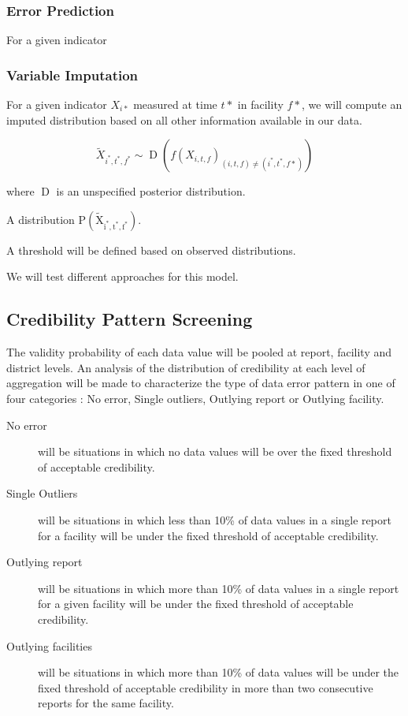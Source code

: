 \subsubsection{Error Prediction}

For a given indicator

\subsubsection{Variable Imputation}

For a given indicator $X_{i*}$ measured at time $t*$ in facility $f*$, we will compute an imputed distribution based on all other information available in our data.

$$ \widetilde{X}_{i^*,t^*,f^*} \sim \operatorname{D} \left(f\left(X_{i,t,f}\right)_{ \left(i,t,f\right) \neq \left(i^*,t^*,f*\right) } \right) $$

where $\operatorname{D}$ is an unspecified posterior distribution.

A distribution $\operatorname{P(\widetilde{X}_{i^*,t^*,f^*} )}$.

A threshold will be defined based on observed distributions.

We will test different approaches for this model.


\subsection{Credibility Pattern Screening}

The validity probability of each data value will be pooled at report, facility and district levels. An analysis of the distribution of credibility at each level of aggregation will be made to characterize the type of data error pattern in one of four categories : No error, Single outliers, Outlying report or Outlying facility.
\begin{description}
    \item[No error] will be situations in which no data values will be over the fixed threshold of acceptable credibility.
    \item[Single Outliers] will be situations in which less than 10\% of data values in a single report for a facility will be under the fixed threshold of acceptable credibility.
    \item[Outlying report] will be situations in which more than 10\% of data values in a single report for a given facility will be under the fixed threshold of acceptable credibility.
    \item[Outlying facilities] will be situations in which more than 10\% of data values will be under the fixed threshold of acceptable credibility in more than two consecutive reports for the same facility.
\end{description}


